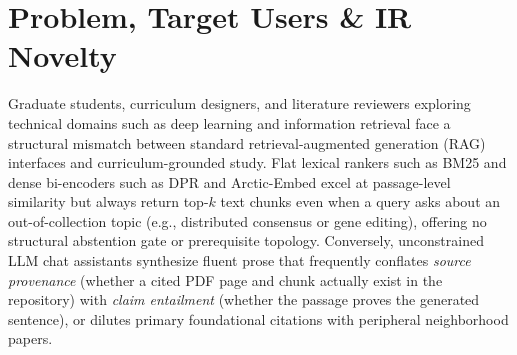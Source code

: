\documentclass[sigconf]{acmart}
\begin{document}


\maketitle

\section{Problem, Target Users \& IR Novelty}
Graduate students, curriculum designers, and literature reviewers exploring technical
domains such as deep learning and information retrieval face a structural mismatch
between standard retrieval-augmented generation (RAG) interfaces \cite{lewis2020rag}
and curriculum-grounded study. Flat lexical rankers such as BM25
\cite{robertson2009bm25} and dense bi-encoders such as DPR \cite{karpukhin2020dpr}
and Arctic-Embed \cite{merrick2024arctic} excel at passage-level similarity but
always return top-$k$ text chunks even when a query asks about an out-of-collection
topic (e.g., distributed consensus or gene editing), offering no structural
abstention gate or prerequisite topology. Conversely, unconstrained LLM chat
assistants synthesize fluent prose that frequently conflates \emph{source provenance}
(whether a cited PDF page and chunk actually exist in the repository) with
\emph{claim entailment} (whether the passage proves the generated sentence), or
dilutes primary foundational citations with peripheral neighborhood papers.
\end{document}
